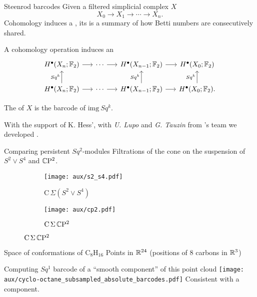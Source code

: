 \begin{frame}[fragile]{Steenrod barcodes}
	Given a filtered simplicial complex $X$
	\[
	X_0 \to X_1 \to \cdots \to X_n.
	\]
	Cohomology induces a , its  is a summary of how Betti numbers are consecutively shared.

	\smallskip
	A cohomology operation induces an 
	\[
	\begin{tikzcd}[column sep = 15]
	H^\bullet(X_n; \Ftwo) \arrow[r] & \cdots \arrow[r] & H^\bullet(X_{n-1}; \Ftwo) \arrow[r] & H^\bullet(X_0; \Ftwo) \\
	H^\bullet(X_n; \Ftwo) \arrow[u, "Sq^k"] \arrow[r] & \cdots \arrow[r] & H^\bullet(X_{n-1}; \Ftwo) \arrow[u, "Sq^k"] \arrow[r] & H^\bullet(X_0; \Ftwo) \arrow[u, "Sq^k"].
	\end{tikzcd}
	\]

	\pause
	The  of $X$ is the barcode of $\mathrm{img}\ Sq^k$.

	\bigskip\pause
	With the support of K. Hess', with \textit{U. Lupo} and \textit{G. Tauzin} from 's team \medskip
	we developed .
\end{frame}

\begin{frame}{Comparing persistent $Sq^2$-modules} \pause
	Filtrations of the cone on the suspension of $S^2 \vee S^4$ and $\mathbb{C} \mathrm{P}^2$.

	\pause
	\begin{figure}
		\centering
		\begin{subfigure}[b]{0.49\textwidth}
			\centering
			\texttt{[image: aux/s2\_s4.pdf]}
			\caption{$\mathrm C\,\Sigma(S^2 \vee S^4)$}
			\label{f:s2_s4}
		\end{subfigure}
		\begin{subfigure}[b]{0.49\textwidth}
			\centering
			\texttt{[image: aux/cp2.pdf]}
			\caption{$\mathrm C\,\Sigma\,\mathbb{C}\mathrm{P}^2$}
			\label{f:cp2}
		\end{subfigure}
	\end{figure}
\end{frame}

\begin{frame}{Space of conformations of $\mathrm{C_8H_{16}}$}
	\pause
	Points in $\mathbb{R}^{24}$ (positions of $8$ carbons in $\mathbb{R}^3$)

	\pause\smallskip
	Computing $Sq^1$ barcode of a ``smooth component'' of this point cloud
	\smallskip
	\texttt{[image: aux/cyclo-octane\_subsampled\_absolute\_barcodes.pdf]}
	Consistent with a  component.
\end{frame}

